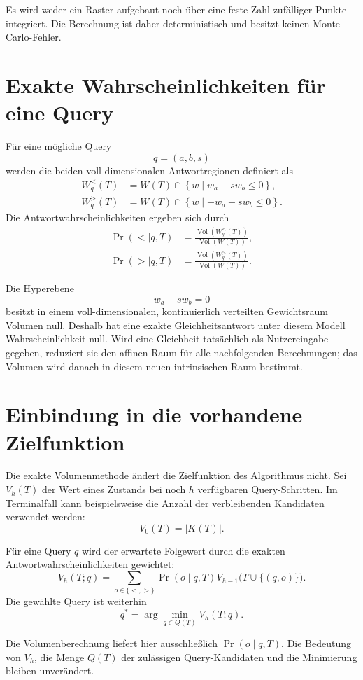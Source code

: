 \documentclass[11pt,a4paper]{article}
\newcommand{\Vol}{\operatorname{Vol}}
\begin{document}
Es wird weder ein Raster aufgebaut noch über eine feste Zahl zufälliger Punkte
integriert. Die Berechnung ist daher deterministisch und besitzt keinen
Monte-Carlo-Fehler.

\section{Exakte Wahrscheinlichkeiten für eine Query}

Für eine mögliche Query
\[
  q=(a,b,s)
\]
werden die beiden voll-dimensionalen Antwortregionen definiert als
\begin{align*}
  W_q^{<}(T)
  &=
  W(T)\cap
  \left\{w\mid w_a-s w_b\leq 0\right\},\\
  W_q^{>}(T)
  &=
  W(T)\cap
  \left\{w\mid -w_a+s w_b\leq 0\right\}.
\end{align*}
Die Antwortwahrscheinlichkeiten ergeben sich durch
\begin{align*}
  \Pr(<\mid q,T)
  &=
  \frac{\Vol(W_q^{<}(T))}{\Vol(W(T))},\\
  \Pr(>\mid q,T)
  &=
  \frac{\Vol(W_q^{>}(T))}{\Vol(W(T))}.
\end{align*}

Die Hyperebene
\[
  w_a-s w_b=0
\]
besitzt in einem voll-dimensionalen, kontinuierlich verteilten Gewichtsraum
Volumen null. Deshalb hat eine exakte Gleichheitsantwort unter diesem Modell
Wahrscheinlichkeit null. Wird eine Gleichheit tatsächlich als Nutzereingabe
gegeben, reduziert sie den affinen Raum für alle nachfolgenden Berechnungen;
das Volumen wird danach in diesem neuen intrinsischen Raum bestimmt.

\section{Einbindung in die vorhandene Zielfunktion}

Die exakte Volumenmethode ändert die Zielfunktion des Algorithmus nicht. Sei
$V_h(T)$ der Wert eines Zustands bei noch $h$ verfügbaren Query-Schritten. Im
Terminalfall kann beispielsweise die Anzahl der verbleibenden Kandidaten
verwendet werden:
\[
  V_0(T)=|K(T)|.
\]

Für eine Query $q$ wird der erwartete Folgewert durch die exakten
Antwortwahrscheinlichkeiten gewichtet:
\[
  V_h(T;q)
  =
  \sum_{o\in\{<,>\}}
  \Pr(o\mid q,T)
  V_{h-1}\bigl(T\cup\{(q,o)\}\bigr).
\]
Die gewählte Query ist weiterhin
\[
  q^*
  =
  \arg\min_{q\in Q(T)}V_h(T;q).
\]

Die Volumenberechnung liefert hier ausschließlich
$\Pr(o\mid q,T)$. Die Bedeutung von $V_h$, die Menge $Q(T)$ der zulässigen
Query-Kandidaten und die Minimierung bleiben unverändert.
\end{document}
